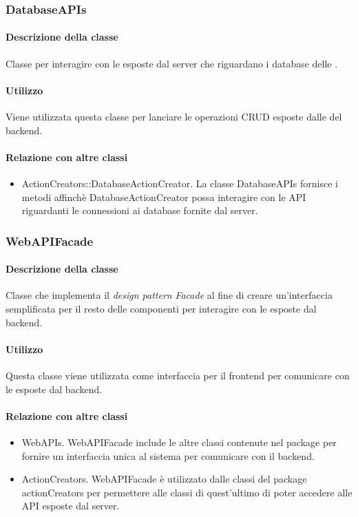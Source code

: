 \subsubsection{DatabaseAPIs}
\paragraph*{Descrizione della classe}
Classe per interagire con le  esposte dal server che riguardano i database delle .

\paragraph*{Utilizzo}
Viene utilizzata questa classe per lanciare le operazioni CRUD esposte dalle  del backend.

\paragraph*{Relazione con altre classi}
\begin{itemize}
\item ActionCreators::DatabaseActionCreator. La classe DatabaseAPIs fornisce i metodi affinchè DatabaseActionCreator possa interagire con le API riguardanti le connessioni ai database fornite dal server.
\end{itemize}

\subsubsection{WebAPIFacade}
\paragraph*{Descrizione della classe}
Classe che implementa il \textit{design pattern} \textit{Facade} al fine di creare un'interfaccia semplificata per il resto delle componenti per interagire con le  esposte dal backend.
\paragraph*{Utilizzo}
Questa classe viene utilizzata come interfaccia per il frontend per comunicare con le  esposte dal backend.
\paragraph*{Relazione con altre classi}
\begin{itemize}
\item WebAPIs. WebAPIFacade include le altre classi contenute nel package per fornire un interfaccia unica al sistema per comunicare con il backend.
\item ActionCreators. WebAPIFacade è utilizzato dalle classi del package actionCreators per permettere alle classi di quest'ultimo di poter accedere alle API esposte dal server. 
\end{itemize} 

